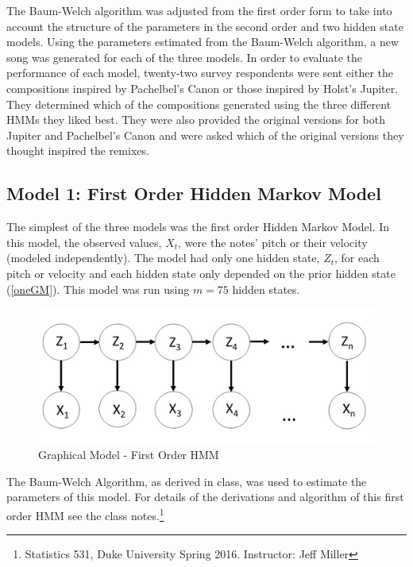 \documentclass{article} %
\begin{document}
The Baum-Welch algorithm was adjusted from the  first order form to take into account the structure of the parameters in the second order and two hidden state models.   Using the parameters estimated from the Baum-Welch algorithm, a new song was generated for each of the three models. In order to evaluate the performance of each model, twenty-two survey respondents were sent either the compositions inspired by Pachelbel's Canon or those inspired by Holst's Jupiter. They determined which of the compositions generated using the three different HMMs they liked best. They were also provided  the original versions for both Jupiter and Pachelbel's Canon and were asked which of the original versions they thought inspired the remixes. 

\subsection {Model 1: First Order Hidden Markov Model}

The simplest of the three models was the first order Hidden Markov Model. In this model, the observed values, $X_t$, were the notes' pitch or their velocity (modeled independently). The model had only one hidden state, $Z_t$, for each pitch or velocity  and each hidden state only depended on the prior hidden state (\autoref{oneGM}). This model was run using $m = 75$ hidden states.

\begin{figure}[H]
\begin{center}


\includegraphics [scale = 0.35] {Model1.jpg}

\caption{Graphical Model - First Order HMM \label{oneGM}}
\end{center}
\end{figure}

The Baum-Welch Algorithm, as derived in class, was used to estimate the parameters of this model. For details of the derivations and algorithm of this first order HMM see the class notes.\footnote{Statistics 531, Duke University Spring 2016. Instructor: Jeff Miller}
 
\end{document}
